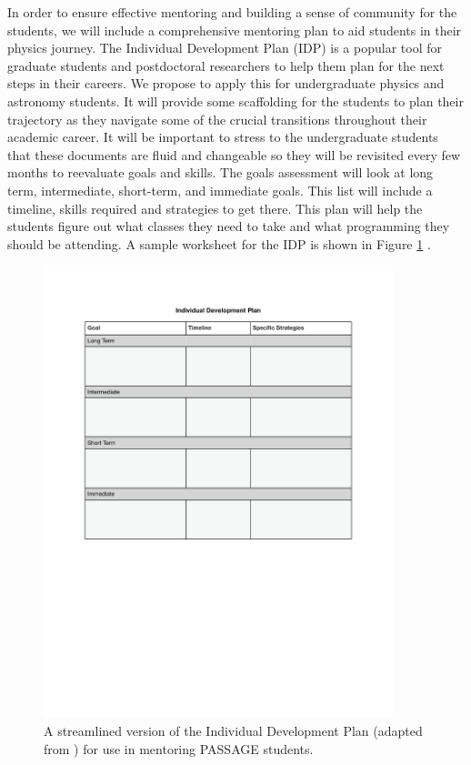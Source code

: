 \documentclass[12pt]{article}
\begin{document}
In order to ensure effective mentoring and building a sense of community for the students, we will include a comprehensive mentoring plan to aid students in their physics journey.  The Individual Development Plan (IDP) is a popular tool for graduate students and postdoctoral researchers to help them plan for the next steps in their careers. We propose to apply this for undergraduate physics and astronomy students.  It will provide some scaffolding for the students to plan their trajectory as they navigate some of the crucial transitions throughout their academic career.  It will be important to stress to the undergraduate students that these documents are fluid and changeable so they will be revisited every few months to reevaluate goals and skills.  %
The goals assessment will look at long term, intermediate, short-term, and immediate goals. This list will include a timeline, skills required and strategies to get there. 
This plan will help the students figure out what classes they need to take and what programming they should be attending. A sample worksheet for the IDP is shown in Figure \ref{fig:IDP} \citep{Bosch}.  

\begin{figure}
    \centering
    \includegraphics[width=4in]{IDP.pdf}
    \caption{A streamlined version of the Individual Development Plan (adapted from \citet{Bosch}) for use in mentoring PASSAGE students.}
    \label{fig:IDP}
   \vspace{-5mm}
\end{figure}
\end{document}
